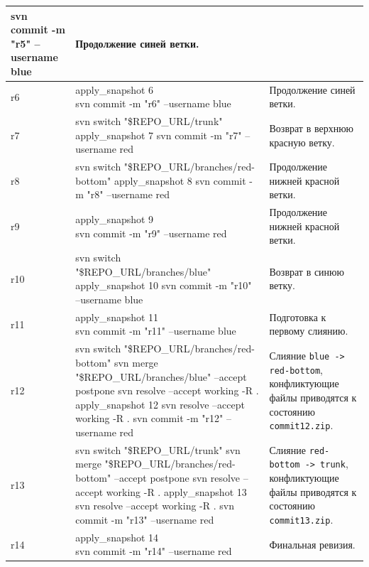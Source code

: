 \documentclass[12pt]{article}
\newcommand{\cmdcell}[1]{\parbox[t]{\linewidth}{\ttfamily\small\raggedright\strut #1\strut}}
\begin{document}
\begin{xltabular}{\linewidth}{|L{0.10\textwidth}|K|M|}
{svn commit -m "r5" --username blue} &
Продолжение синей ветки. \\
\hline
r6 &
\cmdcell{apply\_snapshot 6\\
svn commit -m "r6" --username blue} &
Продолжение синей ветки. \\
\hline
r7 &
\cmdcell{svn switch "\$REPO\_URL/trunk"\\
apply\_snapshot 7\\
svn commit -m "r7" --username red} &
Возврат в верхнюю красную ветку. \\
\hline
r8 &
\cmdcell{svn switch "\$REPO\_URL/branches/red-bottom"\\
apply\_snapshot 8\\
svn commit -m "r8" --username red} &
Продолжение нижней красной ветки. \\
\hline
r9 &
\cmdcell{apply\_snapshot 9\\
svn commit -m "r9" --username red} &
Продолжение нижней красной ветки. \\
\hline
r10 &
\cmdcell{svn switch "\$REPO\_URL/branches/blue"\\
apply\_snapshot 10\\
svn commit -m "r10" --username blue} &
Возврат в синюю ветку. \\
\hline
r11 &
\cmdcell{apply\_snapshot 11\\
svn commit -m "r11" --username blue} &
Подготовка к первому слиянию. \\
\hline
r12 &
\cmdcell{svn switch "\$REPO\_URL/branches/red-bottom"\\
svn merge "\$REPO\_URL/branches/blue" --accept postpone\\
svn resolve --accept working -R .\\
apply\_snapshot 12\\
svn resolve --accept working -R .\\
svn commit -m "r12" --username red} &
Слияние \texttt{blue -> red-bottom}, конфликтующие файлы приводятся к состоянию \texttt{commit12.zip}. \\
\hline
r13 &
\cmdcell{svn switch "\$REPO\_URL/trunk"\\
svn merge "\$REPO\_URL/branches/red-bottom" --accept postpone\\
svn resolve --accept working -R .\\
apply\_snapshot 13\\
svn resolve --accept working -R .\\
svn commit -m "r13" --username red} &
Слияние \texttt{red-bottom -> trunk}, конфликтующие файлы приводятся к состоянию \texttt{commit13.zip}. \\
\hline
r14 &
\cmdcell{apply\_snapshot 14\\
svn commit -m "r14" --username red} &
Финальная ревизия. \\
\hline
\end{xltabular}
\end{document}
